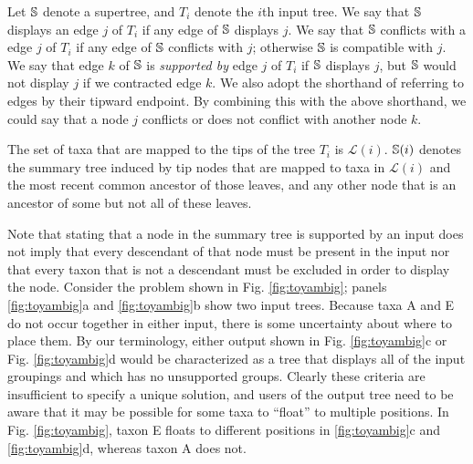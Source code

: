 \documentclass[fleqn,12pt,lineno,english]{wlpeerj}
\begin{document}
Let $\mathbb{S}$ denote a supertree, and $T_{i}$ denote the $i$th
input tree. We say that $\mathbb{S}$ displays an edge $j$ of $T_{i}$
if any edge of $\mathbb{S}$ displays $j$. We say that $\mathbb{S}$
conflicts with a edge $j$ of $T_{i}$ if any edge of $\mathbb{S}$
conflicts with $j$; otherwise $\mathbb{S}$ is compatible with
$j$. We say that edge $k$ of $\mathbb{S}$ is \emph{supported
by} edge $j$ of $T_{i}$ if $\mathbb{S}$ displays $j$, but $\mathbb{S}$
would not display $j$ if we contracted edge $k$. We also adopt the
shorthand of referring to edges by their tipward endpoint. By combining
this with the above shorthand, we could say that a node $j$ conflicts
or does not conflict with another node $k$.

The set of taxa that are mapped to the tips of the tree $T_{i}$ is
$\mathcal{L}(i)$. $\mathbb{S}(i)$ denotes the summary tree induced
by tip nodes that are mapped to taxa in $\mathcal{L}(i)$ and the
most recent common ancestor of those leaves, and any other node that
is an ancestor of some but not all of these leaves. 

Note that stating that a node in the summary tree is supported by
an input does not imply that every descendant of that node must be
present in the input nor that every taxon that is not a descendant
must be excluded in order to display the node. Consider the problem
shown in Fig. \ref{fig:toyambig}; panels \ref{fig:toyambig}a
and \ref{fig:toyambig}b show two input trees. Because taxa A and
E do not occur together in either input, there is some uncertainty
about where to place them. By our terminology, either output shown
in Fig. \ref{fig:toyambig}c or Fig. \ref{fig:toyambig}d would be characterized
as a tree that displays all of the input groupings and which has no
unsupported groups. Clearly these criteria are insufficient to specify
a unique solution, and users of the output tree need to be aware that
it may be possible for some taxa to ``float'' to multiple positions.
In Fig. \ref{fig:toyambig}, taxon E floats to different positions
in \ref{fig:toyambig}c and \ref{fig:toyambig}d, whereas taxon
A does not. 
\end{document}
